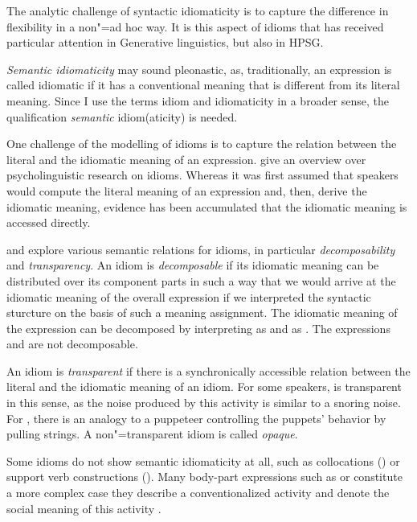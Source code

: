 \documentclass[output=paper]{langsci/langscibook}
\begin{document}
The analytic challenge of syntactic idiomaticity is to capture the difference in flexibility in a non"=ad hoc way. It is this aspect of idioms that has received particular attention in Generative linguistics, but also in HPSG.%

\emph{Semantic idiomaticity} may sound pleonastic, as, traditionally, an expression is called idiomatic if it has a conventional meaning that is different from its literal meaning. 
Since I use the terms idiom and idiomaticity in a broader sense, the qualification \emph{semantic} idiom(aticity) is needed. 

One challenge of the modelling of idioms is to capture the relation between the literal and the idiomatic meaning of an expression.
\cite{Gibbs:Colston:07} give an overview over 
psycholinguistic research on idioms. Whereas it was first assumed that speakers would compute the literal meaning of an expression and, then, derive the idiomatic meaning, evidence has been accumulated that the idiomatic meaning is accessed directly.

\cite{WSN84a-u} and \cite{NSW94a} explore various semantic relations for idioms, in particular \emph{decomposability}  and \emph{transparency}.
An idiom is \emph{decomposable} if its idiomatic meaning can be distributed over its component parts in such a way that we would arrive at the idiomatic meaning of the overall expression if we interpreted the syntactic sturcture on the basis of such a meaning assignment. 
The idiomatic meaning of the expression  can be decomposed by interpreting  as  and  as . 
The expressions  and  are not decomposable.

An idiom is \emph{transparent} if there is a synchronically accessible relation between the literal and the idiomatic meaning of an idiom. 
For some speakers,  is transparent in this sense, as the noise produced by this activity is similar to a snoring noise. 
For , there is an analogy to a puppeteer controlling the puppets' behavior by pulling strings. A non"=transparent idiom is called \emph{opaque}. 

Some idioms do not show semantic idiomaticity at all, such as collocations () or support verb constructions (). 
Many body-part expressions such as  or  constitute a more complex case they describe a conventionalized activity and denote the social meaning of this activity \citep{Burger:76}.
\end{document}

